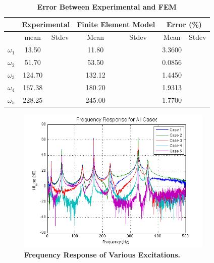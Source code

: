 \documentclass[paper=a4, fontsize=12pt]{scrartcl} %
\begin{document}
\begin{table}[htbp]
  \centering
  \caption{\textbf{Error Between Experimental and FEM }}
    \begin{tabular}{| c | c | c | c | c | c | c |}
    \hline
    \multicolumn{1}{|c|}{\multirow{2}[0]{*}{}} & \multicolumn{2}{|c|}{Experimental} & \multicolumn{2}{|c|}{Finite Element Model} & \multicolumn{2}{|c|}{Error (\%)} \\ \hline
    \multicolumn{1}{|c|}{} & \multicolumn{1}{|c|}{mean } & \multicolumn{1}{c}{Stdev} & \multicolumn{1}{|c|}{Mean} & \multicolumn{1}{|c|}{Stdev} & \multicolumn{1}{|c|}{Mean} & \multicolumn{1}{|c|}{Stdev} \\ \hline
    $\omega_1$ &      13.50 &       &     11.80  &       &    3.3600   &  \\ \hline
    $\omega_2$ &      51.70 &       &     53.50  &       &    0.0856   &  \\ \hline
    $\omega_3$ &      124.70 &       &    132.12   &       &  1.4450     &  \\ \hline
    $\omega_4$ &      167.38 &       &   180.70    &       &  1.9313     &  \\ \hline
    $\omega_5$ &      228.25 &       &   245.00    &       &    1.7700   &  \\ \hline
    \end{tabular}%
  \label{table:ERROR}%
\end{table}%
% 
\begin{figure}[H]
	\centering
	\includegraphics[height = 7.0cm]{Pictures/Lab4_vibes_01.png}
	\caption{\textbf{Frequency Response of Various Excitations.}} 
	\label{fig:cruiseMissile_FRF}
\end{figure}
%
\end{document}
